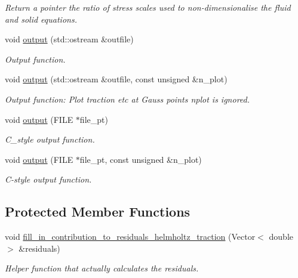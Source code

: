\begin{DoxyCompactItemize}
\begin{DoxyCompactList}\small\item\em Return a pointer the ratio of stress scales used to non-\/dimensionalise the fluid and solid equations. \end{DoxyCompactList}\item 
void \hyperlink{classoomph_1_1FourierDecomposedTimeHarmonicLinElastLoadedByHelmholtzPressureBCElement_af1db6d117e79ceb536932adf64ea4752}{output} (std\+::ostream \&outfile)
\begin{DoxyCompactList}\small\item\em Output function. \end{DoxyCompactList}\item 
void \hyperlink{classoomph_1_1FourierDecomposedTimeHarmonicLinElastLoadedByHelmholtzPressureBCElement_a2c55e922cbc2a9f901356a47f696c0d6}{output} (std\+::ostream \&outfile, const unsigned \&n\+\_\+plot)
\begin{DoxyCompactList}\small\item\em Output function\+: Plot traction etc at Gauss points nplot is ignored. \end{DoxyCompactList}\item 
void \hyperlink{classoomph_1_1FourierDecomposedTimeHarmonicLinElastLoadedByHelmholtzPressureBCElement_a147a337796e4e10c43a956a85b441a5e}{output} (F\+I\+LE $\ast$file\+\_\+pt)
\begin{DoxyCompactList}\small\item\em C\+\_\+style output function. \end{DoxyCompactList}\item 
void \hyperlink{classoomph_1_1FourierDecomposedTimeHarmonicLinElastLoadedByHelmholtzPressureBCElement_a2383a2f19b7e45177f0a44f5d68fc2e9}{output} (F\+I\+LE $\ast$file\+\_\+pt, const unsigned \&n\+\_\+plot)
\begin{DoxyCompactList}\small\item\em C-\/style output function. \end{DoxyCompactList}\end{DoxyCompactItemize}
\subsection*{Protected Member Functions}
\begin{DoxyCompactItemize}
\item 
void \hyperlink{classoomph_1_1FourierDecomposedTimeHarmonicLinElastLoadedByHelmholtzPressureBCElement_abae27d4531220695eeb385c51ca0f82f}{fill\+\_\+in\+\_\+contribution\+\_\+to\+\_\+residuals\+\_\+helmholtz\+\_\+traction} (Vector$<$ double $>$ \&residuals)
\begin{DoxyCompactList}\small\item\em Helper function that actually calculates the residuals. \end{DoxyCompactList}\end{DoxyCompactItemize}
